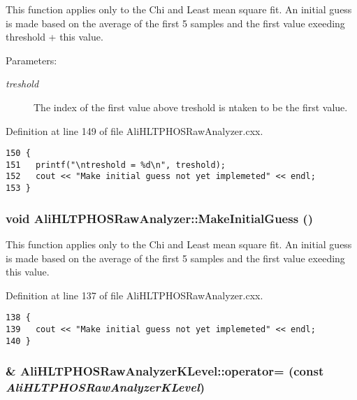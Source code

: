 This function applies only to the Chi and Least mean square fit. An initial guess is made based on the average of the first 5 samples and the first value exeeding threshold + this value. \begin{Desc}
\item[Parameters:]
\begin{description}
\item[{\em treshold}]The index of the first value above treshold is ntaken to be the first value. \end{description}
\end{Desc}


Definition at line 149 of file Ali\-HLTPHOSRaw\-Analyzer.cxx.

\footnotesize\begin{verbatim}150 {
151   printf("\ntreshold = %d\n", treshold);
152   cout << "Make initial guess not yet implemeted" << endl;  
153 }
\end{verbatim}\normalsize 


\subsubsection{\setlength{\rightskip}{0pt plus 5cm}void Ali\-HLTPHOSRaw\-Analyzer::Make\-Initial\-Guess ()\hspace{0.3cm}{\tt  [inherited]}}\label{classAliHLTPHOSRawAnalyzer_AliHLTPHOSRawAnalyzerPeakFindera15}


This function applies only to the Chi and Least mean square fit. An initial guess is made based on the average of the first 5 samples and the first value exeeding this value. 

Definition at line 137 of file Ali\-HLTPHOSRaw\-Analyzer.cxx.

\footnotesize\begin{verbatim}138 {
139   cout << "Make initial guess not yet implemeted" << endl;
140 }
\end{verbatim}\normalsize 


\subsubsection{\& Ali\-HLTPHOSRaw\-Analyzer\-KLevel::operator= (const  {\em Ali\-HLTPHOSRaw\-Analyzer\-KLevel})\hspace{0.3cm}{\tt  [inline]}}\label{classAliHLTPHOSRawAnalyzerKLevel_AliHLTPHOSRawAnalyzerKLevela2}




